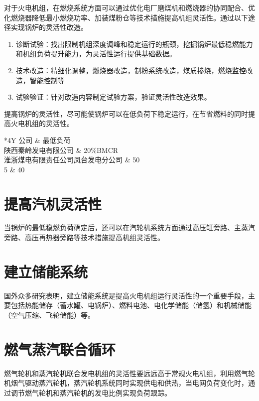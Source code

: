 

对于火电机组，在燃烧系统方面可以通过优化电厂磨煤机和燃烧器的协同配合、优化燃烧器降低最小燃烧功率、加装煤粉仓等技术措施提高机组灵活性。通过以下途径实现锅炉的灵活性改造。

\begin{enumerate}
	\renewcommand{\labelenumi}{(\theenumi)}
	\item 诊断试验：找出限制机组深度调峰和稳定运行的瓶颈，挖掘锅炉最低稳燃能力和机组负荷提升能力，为灵活性运行提供基础数据。
	\item 技术改造：精细化调整，燃烧器改造，制粉系统改造，煤质掺烧，燃烧监控改造，智能控制等
	\item 试验验证：针对改造内容制定试验方案，验证灵活性改造效果。
\end{enumerate}

提高锅炉的灵活性，尽可能使锅炉可以在低负荷下稳定运行，在节省燃料的同时提高火电机组的灵活性。

\begin{table}[!ht]
	\renewcommand{\arraystretch}{1.2}
	\centering\wuhao
	\caption{国内部分燃煤机组锅炉最低稳燃负荷} \label{tab_ch2} \vspace{2mm}
	\begin{tabularx}{\textwidth}{*{4}Y}
	\toprule[1.5pt]
		公司 & 最低负荷 \\
	\midrule[1pt]
		陕西秦岭发电有限公司 & 20\%BMCR \\
		淮浙煤电有限责任公司凤台发电分公司 & 50 \\
		 5 & 40 \\
	\bottomrule[1.5pt]
	\end{tabularx}
\end{table}

\section{提高汽机灵活性}
当锅炉的最低稳燃负荷确定后，还可以在汽轮机系统方面通过高压缸旁路、主蒸汽旁路、高压再热器旁路等技术措施提高机组灵活性。

\section{建立储能系统}
国外众多研究表明，建立储能系统是提高火电机组运行灵活性的一个重要手段，主要包括热能储存（蓄水罐、电锅炉）、燃料电池、电化学储能（储氢）和机械储能（空气压缩、飞轮储能）等。 

\section{燃气蒸汽联合循环}
燃气轮机和蒸汽轮机联合发电机组的灵活性要远远高于常规火电机组，利用燃气轮机烟气驱动蒸汽轮机，蒸汽轮机系统同时实现供电和供热，当电网负荷变化时，通过调节燃气轮机和蒸汽轮机的发电比例实现负荷跟踪。